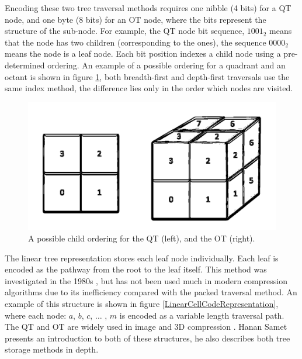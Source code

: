 Encoding these two tree traversal methods requires one nibble (4 bits) for a QT node, and one byte (8 bits) for an OT node, where the bits represent the structure of the sub-node. For example, the QT node bit sequence, $1001_2$ means that the node has two children (corresponding to the ones), the sequence $0000_2$ means the node is a leaf node. Each bit position indexes a child node using a pre-determined ordering. An example of a possible ordering for a quadrant and an octant is shown in figure \ref{ChildOrderExample}, both breadth-first and depth-first traversals use the same index method, the difference lies only in the order which nodes are visited. 

\begin{figure}[!h]
\centering
\includegraphics[width=12cm]{images/ch2/ChildOrderExample}
\caption{A possible child ordering for the QT (left), and the OT (right).}
\label{ChildOrderExample}
\end{figure}

The linear tree representation stores each leaf node individually. Each leaf is encoded as the pathway from the root to the leaf itself. This method was investigated in the 1980s \cite{Gargantini82Effective,Yufei88Octcodes}, but has not been used much in modern compression algorithms due to its inefficiency compared with the packed traversal method. An example of this structure is shown in figure \ref{LinearCellCodeRepresentation}, where each node: $a$, $b$, $c$, $\dots$ , $m$  is encoded as a variable length traversal path. The QT and OT are widely used in image \cite{Varma12Application} and 3D compression \cite{Schnabel06Octree}. Hanan Samet \cite{Samet88Fund1} presents an introduction to both of these structures, he also describes both tree storage methods in depth. 

